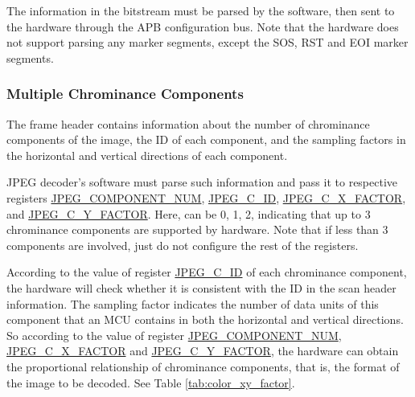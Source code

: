 \documentclass[main\_\_EN.tex]{subfiles}
\begin{document}
The information in the bitstream must be parsed by the software, then sent to the hardware through the APB configuration bus. Note that the hardware does not support parsing any marker segments, except the SOS, RST and EOI marker segments.

\subsubsection{Multiple Chrominance Components}
\label{sec:jpegcodec-dec-color_components}

The frame header contains information about the number of chrominance components of the image, the ID of each component, and the sampling factors in the horizontal and vertical directions of each component.

JPEG decoder's software must parse such information and pass it to respective registers \hyperref[fielddesc:JPEGCOMPONENTNUM]{JPEG\_COMPONENT\_NUM}, \hyperref[regdesc:JPEGC0REG]{JPEG\_C\_ID}, \hyperref[fielddesc:JPEGC0xFACTOR]{JPEG\_C\_X\_FACTOR}, and \hyperref[fielddesc:JPEGC0YFACTOR]{JPEG\_C\_Y\_FACTOR}. Here,  can be 0, 1, 2, indicating that up to 3 chrominance components are supported by hardware. Note that if less than 3 components are involved, just do not configure the rest of the registers.

According to the value of register \hyperref[regdesc:JPEGC0REG]{JPEG\_C\_ID} of each chrominance component, the hardware will check whether it is consistent with the ID in the scan header information. The sampling factor indicates the number of data units of this component that an MCU contains in both the horizontal and vertical directions. So according to the value of register \hyperref[fielddesc:JPEGCOMPONENTNUM]{JPEG\_COMPONENT\_NUM}, \hyperref[fielddesc:JPEGC0xFACTOR]{JPEG\_C\_X\_FACTOR} and \hyperref[fielddesc:JPEGC0YFACTOR]{JPEG\_C\_Y\_FACTOR}, the hardware can obtain the proportional relationship of chrominance components, that is, the format of the image to be decoded. See Table \ref{tab:color_xy_factor}.
\end{document}
